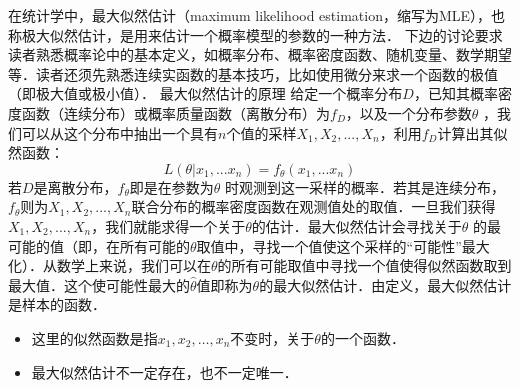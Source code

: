 \begin{issues}
\issueTODO
\end{issues}
在统计学中，最大似然估计（maximum likelihood estimation，缩写为MLE），也称极大似然估计，是用来估计一个概率模型的参数的一种方法．
下边的讨论要求读者熟悉概率论中的基本定义，如概率分布、概率密度函数、随机变量、数学期望等．读者还须先熟悉连续实函数的基本技巧，比如使用微分来求一个函数的极值（即极大值或极小值）．
最大似然估计的原理
给定一个概率分布$D $，已知其概率密度函数（连续分布）或概率质量函数（离散分布）为$f_D $，以及一个分布参数$\theta $ ，我们可以从这个分布中抽出一个具有$n$个值的采样$X_{1},X_{2},... ,X_{n} $，利用$f_D$计算出其似然函数：
$$
L(\theta|x_1,...x_n ) = f_{\theta }(x_1,...x_n )
$$
若$D$是离散分布，$f_{\theta }$即是在参数为$\theta$ 时观测到这一采样的概率．若其是连续分布，$f_{\theta }$则为$X_{1},X_{2},... ,X_{n} $联合分布的概率密度函数在观测值处的取值．一旦我们获得$X_{1},X_{2},... ,X_{n} $，我们就能求得一个关于$\theta $的估计．最大似然估计会寻找关于$\theta$ 的最可能的值（即，在所有可能的$\theta $取值中，寻找一个值使这个采样的“可能性”最大化）．从数学上来说，我们可以在$\theta $的所有可能取值中寻找一个值使得似然函数取到最大值．这个使可能性最大的$\widehat{\theta}$值即称为$\theta $的最大似然估计．由定义，最大似然估计是样本的函数．
\begin{itemize}
\item 这里的似然函数是指$x_1,x_2,\ldots,x_n$不变时，关于$\theta $的一个函数．
\item 最大似然估计不一定存在，也不一定唯一．
\end{itemize}


